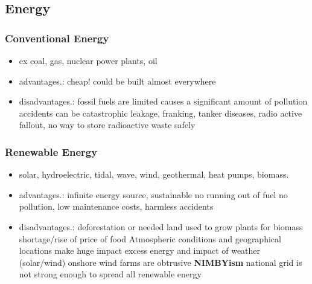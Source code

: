 \documentclass[a5paper,12pt,twoside,titlepage]{scrartcl}
\begin{document}
\subsection{Energy}
	\subsubsection{Conventional Energy}
		\begin{itemize} 
			\item ex coal, gas, nuclear power plants, oil
			\item advantages.:
			\subitem cheap! could be built almost everywhere
			\item disadvantages.:
			\subitem fossil fuels are limited
			\subitem causes a significant amount of pollution
			\subitem accidents can be catastrophic \textrightarrow leakage, franking, tanker diseases, radio active fallout, no way to store radioactive waste safely 
		\end{itemize}	
	\subsubsection{Renewable Energy}

		\begin{itemize}
			\item solar, hydroelectric, tidal, wave, wind, geothermal, heat pumps, biomass.
			\item advantages.: 
			\subitem infinite energy source, \textrightarrow sustainable \textrightarrow no running out of fuel
			\subitem no pollution, low maintenance costs, harmless accidents
			\item disadvantages.:
			\subitem deforestation or needed land used to grow plants for biomass \textrightarrow shortage/rise of price of food
			\subitem Atmospheric conditions and geographical locations make huge impact
			\subitem excess energy and impact of weather (solar/wind)
			\subitem onshore wind farms are obtrusive
			\subitem \textbf{NIMBYism}
			\subitem national grid is not strong enough to spread all renewable energy
		\end{itemize}
\end{document}
